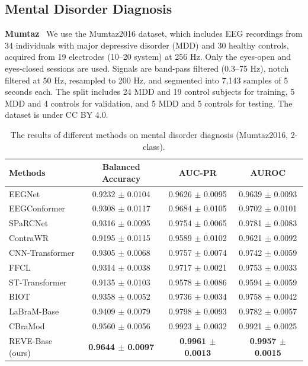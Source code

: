 \documentclass{article}
\begin{document}
\subsection{Mental Disorder Diagnosis}

\textbf{Mumtaz}~\citep{mumtaz2016mdd} 
We use the Mumtaz2016 dataset, which includes EEG recordings from 34 individuals with major depressive disorder (MDD) and 30 healthy controls, acquired from 19 electrodes (10–20 system) at 256 Hz. Only the eyes-open and eyes-closed sessions are used. Signals are band-pass filtered (0.3–75 Hz), notch filtered at 50 Hz, resampled to 200 Hz, and segmented into 7,143 samples of 5 seconds each. The split includes 24 MDD and 19 control subjects for training, 5 MDD and 4 controls for validation, and 5 MDD and 5 controls for testing. The dataset is under CC BY 4.0.

\begin{table}[H]
\centering
\caption{The results of different methods on mental disorder diagnosis (Mumtaz2016, 2-class).}
\small
\begin{tabular}{lccc} 
\toprule
\textbf{Methods} & \textbf{Balanced Accuracy} & \textbf{AUC-PR} & \textbf{AUROC} \\
\midrule
EEGNet            & 0.9232 $\pm$ 0.0104 & 0.9626 $\pm$ 0.0095 & 0.9639 $\pm$ 0.0093 \\
EEGConformer      & 0.9308 $\pm$ 0.0117 & 0.9684 $\pm$ 0.0105 & 0.9702 $\pm$ 0.0101 \\
SPaRCNet          & 0.9316 $\pm$ 0.0095 & 0.9754 $\pm$ 0.0065 & 0.9781 $\pm$ 0.0083 \\
ContraWR          & 0.9195 $\pm$ 0.0115 & 0.9589 $\pm$ 0.0102 & 0.9621 $\pm$ 0.0092 \\
CNN-Transformer   & 0.9305 $\pm$ 0.0068 & 0.9757 $\pm$ 0.0074 & 0.9742 $\pm$ 0.0059 \\
FFCL              & 0.9314 $\pm$ 0.0038 & 0.9717 $\pm$ 0.0021 & 0.9753 $\pm$ 0.0033 \\
ST-Transformer    & 0.9135 $\pm$ 0.0103 & 0.9578 $\pm$ 0.0086 & 0.9594 $\pm$ 0.0059 \\
\midrule
BIOT              & 0.9358 $\pm$ 0.0052 & 0.9736 $\pm$ 0.0034 & 0.9758 $\pm$ 0.0042 \\
LaBraM-Base       & 0.9409 $\pm$ 0.0079 & 0.9798 $\pm$ 0.0093 & 0.9782 $\pm$ 0.0057 \\
CBraMod           & 0.9560 $\pm$ 0.0056 & 0.9923 $\pm$ 0.0032 & 0.9921 $\pm$ 0.0025 \\
\midrule
REVE-Base (ours)        & \textbf{0.9644 $\pm$ 0.0097} & \textbf{0.9961 $\pm$ 0.0013} & \textbf{0.9957 $\pm$ 0.0015}  \\
\bottomrule
\end{tabular}

\label{tab:MDD}
\end{table}
\end{document}
